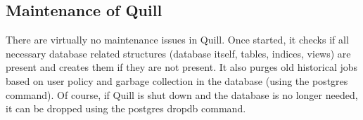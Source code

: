 \subsection{\label{sec:Quill-Maintenance}Maintenance of Quill}

There are virtually no maintenance issues in Quill.  Once started, it
checks if all necessary database related structures (database itself,
tables, indices, views) are present and creates them if they are
not present. It also purges old historical jobs based on user policy
and garbage collection in the database (using the
postgres  command).  Of course, if Quill is shut
down and the database is no longer needed, it can be dropped using the
postgres dropdb command.


